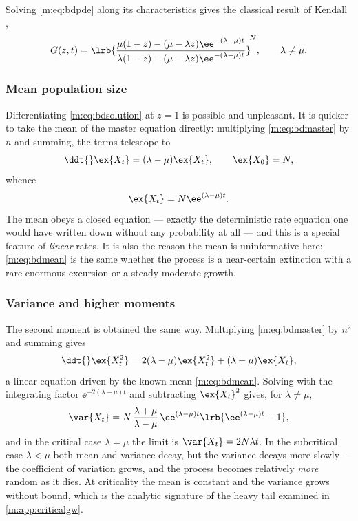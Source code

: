 Solving \cref{m:eq:bdpde} along its characteristics gives the classical result of
Kendall \cite{Kendall1948},
\begin{equation}
\label{m:eq:bdsolution}
G(z,t) = \lrb{\frac{\mu(1-z)-(\mu-\lambda z)\ee^{-(\lambda-\mu)t}}
{\lambda(1-z)-(\mu-\lambda z)\ee^{-(\lambda-\mu)t}}}^{\!N},
\qquad\lambda\neq\mu .
\end{equation}

\subsubsection{Mean population size}
\label{m:sec:mean}

Differentiating \cref{m:eq:bdsolution} at $z=1$ is possible and unpleasant. It is
quicker to take the mean of the master equation directly: multiplying
\cref{m:eq:bdmaster} by $n$ and summing, the terms telescope to
\begin{equation}
\label{m:eq:meanode}
\ddt{}\ex{X_t} = (\lambda-\mu)\ex{X_t},
\qquad
\ex{X_0}=N,
\end{equation}
whence
\begin{equation}
\label{m:eq:bdmean}
\ex{X_t} = N\ee^{(\lambda-\mu)t} .
\end{equation}
The mean obeys a closed equation --- exactly the deterministic rate equation one
would have written down without any probability at all --- and this is a special
feature of \emph{linear} rates. It is also the reason the mean is uninformative
here: \cref{m:eq:bdmean} is the same whether the process is a near-certain
extinction with a rare enormous excursion or a steady moderate growth.

\subsubsection{Variance and higher moments}
\label{m:sec:variance}

The second moment is obtained the same way. Multiplying \cref{m:eq:bdmaster} by
$n^2$ and summing gives
\begin{equation}
\label{m:eq:secondmomentode}
\ddt{}\ex{X_t^2} = 2(\lambda-\mu)\ex{X_t^2} + (\lambda+\mu)\ex{X_t},
\end{equation}
a linear equation driven by the known mean \cref{m:eq:bdmean}. Solving with the
integrating factor $\ee^{-2(\lambda-\mu)t}$ and subtracting $\ex{X_t}^2$ gives, for
$\lambda\neq\mu$,
\begin{equation}
\label{m:eq:bdvariance}
\var{X_t} = N\,\frac{\lambda+\mu}{\lambda-\mu}\,
\ee^{(\lambda-\mu)t}\lrb{\ee^{(\lambda-\mu)t}-1},
\end{equation}
and in the critical case $\lambda=\mu$ the limit is $\var{X_t}=2N\lambda t$. In the
subcritical case $\lambda<\mu$ both mean and
variance decay, but the variance decays more slowly --- the coefficient of
variation grows, and the process becomes relatively \emph{more} random as it dies.
At criticality the mean is constant and the variance grows without bound, which is
the analytic signature of the heavy tail examined in \cref{m:app:criticalgw}.

